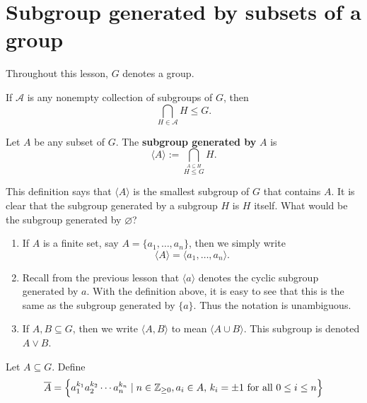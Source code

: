 \documentclass[11pt,a4paper]{article}
\begin{document}
\def\contador{Lesson 8}



\section{Subgroup generated by subsets of a group}

Throughout this lesson, \(G\) denotes a group.

\begin{prop}
    If \(\mathcal{A}\) is any nonempty collection of subgroups of \(G\), then 
    \[\bigcap_{H\in \mathcal{A}} H \leq G.\]
\end{prop}



\begin{defi}
Let \(A\) be any subset of \(G\).
The \textbf{subgroup generated by} \(A\) is 
\[\langle A\rangle := \bigcap_{\stackrel{A\subseteq H }{H\leq G }  } H .\]
\end{defi}

This definition says that \(\langle A\rangle \) is the smallest subgroup of \(G\) that contains \(A\). 
It is clear that   the subgroup generated by a subgroup \(H\) is \(H\) itself. 
What would be the subgroup generated by \(\varnothing\)?


\begin{rem}
\begin{enumerate}[label=(\roman*)]
    \item      If \(A \) is a finite set, say \(A = \{a_1, \ldots, a_n \}\),
    then we simply write \[\langle A\rangle = \langle a_1, \ldots, a_n \rangle .\]

    \item Recall from the previous lesson that \(\langle a\rangle\) denotes the cyclic subgroup generated by \(a\).
    With the definition above, it is easy to see that this is the same as the subgroup generated by \(\{a\}\).
    Thus the notation is unambiguous.

    \item If \(A,B\subseteq G\), then we write  \(\langle A, B \rangle\) to mean  \(\langle A\cup B\rangle \).
    This subgroup is denoted \(A \vee B\). 
\end{enumerate}
\end{rem}
 
\begin{defi}
    Let \(A\subseteq     G\).
    Define 
    \[\overline{A} = \left\{ a_1^{k_1} a_2^{k_2} \cdots a_{n}^{k_n} \mid n\in \mathbb{Z}_{\geq 0}, a_i \in A ,\, k_i = \pm 1 \text{ for all } 0 \leq i\leq n \right\}\]
\end{defi}
\end{document}
